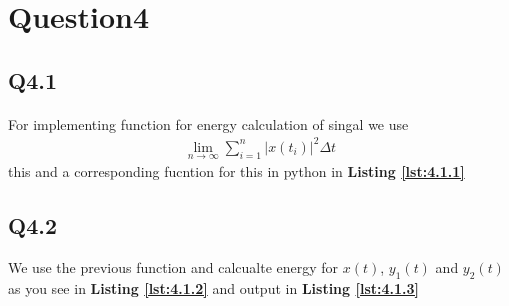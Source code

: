 \newpage
\section{Question4}
\paragraph{}
\subsection{Q4.1}
\paragraph{}
For implementing function for energy calculation of singal
we use
\begin{align}
    \mathop {\lim }\limits_{n \to \infty } \sum\limits_{i = 1}^n {|x\left( {t_i} \right)|^2\Delta t}
    \end{align} this and a corresponding fucntion for this 
    in python in \textbf{Listing \ref{lst:4.1.1}}
   
    \vspace{2ex}
 
  \subsection{Q4.2}
  We use the previous function and calcualte energy for
  $x(t)$, $y_1(t)$ and $y_2(t)$ as you see in
   \textbf{Listing \ref{lst:4.1.2}} and output in \textbf{Listing \ref{lst:4.1.3}}

   \vspace{2ex}

  \vspace{2ex}
 